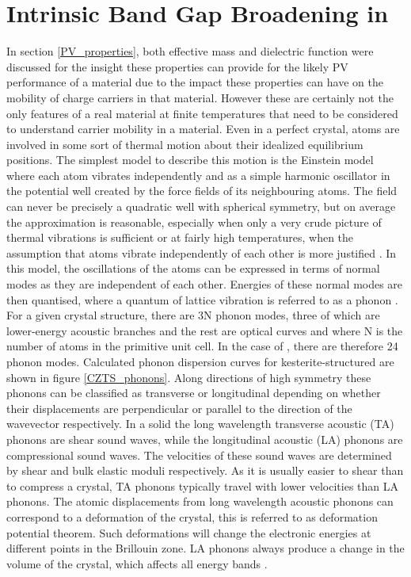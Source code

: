 \section{Intrinsic Band Gap Broadening in {\CZTS}}
In section \ref{PV_properties}, both effective mass and dielectric function were discussed for the insight these properties can provide for the likely PV performance of a material due to the impact these properties can have on the mobility of charge carriers in that material. However these are certainly not the only features of a real material at finite temperatures that need to be considered to understand carrier mobility in a material. 
Even in a perfect crystal, atoms are involved in some sort of thermal motion about their idealized equilibrium positions. The simplest model to describe this motion is the Einstein model where each atom vibrates independently and as a simple harmonic oscillator in the potential well created by the force fields of its neighbouring atoms. The field can never be precisely a quadratic well with spherical symmetry, but on average the approximation is reasonable, especially when only a very crude picture of thermal vibrations is sufficient or at fairly high temperatures, when the assumption that atoms vibrate independently of each other is more justified \cite{Ziman_solids}. In this model, the oscillations of the atoms can be expressed in terms of normal modes as they are independent of each other. Energies of these normal modes are then quantised, where a quantum of lattice vibration is referred to as a phonon \cite{fund_semi}.\\

For a given crystal structure, there are 3N phonon modes, three of which are lower-energy acoustic branches and the rest are optical curves and where N is the number of atoms in the primitive unit cell. In the case of {\CZTS}, there are therefore 24 phonon modes. Calculated phonon dispersion curves for kesterite-structured {\CZTS} are shown in figure \ref{CZTS_phonons}.
Along directions of high symmetry these phonons can be classified as transverse or longitudinal depending on whether their displacements are perpendicular or parallel to the direction of the wavevector respectively. In a solid the long wavelength transverse acoustic (TA) phonons are shear sound waves, while the longitudinal acoustic (LA) phonons are compressional sound waves. The velocities of these sound waves are determined by shear and bulk elastic moduli respectively. As it is usually easier to shear than to compress a crystal, TA phonons typically travel with lower velocities than LA phonons.  
The atomic displacements from long wavelength acoustic phonons can correspond to a deformation of the crystal, this is referred to as deformation potential theorem. Such deformations will change the electronic energies at different points in the Brillouin zone. LA phonons always produce a change in the volume of the crystal, which affects all energy bands \cite{fund_semi}.\\

